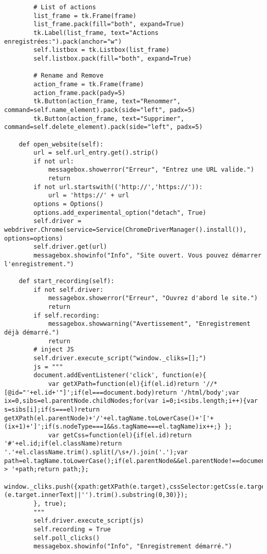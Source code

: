 \documentclass[10pt,a4paper,twocolumn]{article}
\begin{document}
\begin{lstlisting}
        # List of actions
        list_frame = tk.Frame(frame)
        list_frame.pack(fill="both", expand=True)
        tk.Label(list_frame, text="Actions enregistrées:").pack(anchor="w")
        self.listbox = tk.Listbox(list_frame)
        self.listbox.pack(fill="both", expand=True)

        # Rename and Remove
        action_frame = tk.Frame(frame)
        action_frame.pack(pady=5)
        tk.Button(action_frame, text="Renommer", command=self.name_element).pack(side="left", padx=5)
        tk.Button(action_frame, text="Supprimer", command=self.delete_element).pack(side="left", padx=5)

    def open_website(self):
        url = self.url_entry.get().strip()
        if not url:
            messagebox.showerror("Erreur", "Entrez une URL valide.")
            return
        if not url.startswith(('http://','https://')):
            url = 'https://' + url
        options = Options()
        options.add_experimental_option("detach", True)
        self.driver = webdriver.Chrome(service=Service(ChromeDriverManager().install()), options=options)
        self.driver.get(url)
        messagebox.showinfo("Info", "Site ouvert. Vous pouvez démarrer l'enregistrement.")

    def start_recording(self):
        if not self.driver:
            messagebox.showerror("Erreur", "Ouvrez d'abord le site.")
            return
        if self.recording:
            messagebox.showwarning("Avertissement", "Enregistrement déjà démarré.")
            return
        # inject JS
        self.driver.execute_script("window._cliks=[];")
        js = """
        document.addEventListener('click', function(e){
            var getXPath=function(el){if(el.id)return '//*[@id="'+el.id+'"]';if(el===document.body)return '/html/body';var ix=0,sibs=el.parentNode.childNodes;for(var i=0;i<sibs.length;i++){var s=sibs[i];if(s===el)return getXPath(el.parentNode)+'/'+el.tagName.toLowerCase()+'['+(ix+1)+']';if(s.nodeType===1&&s.tagName===el.tagName)ix++;} };
            var getCss=function(el){if(el.id)return '#'+el.id;if(el.className)return '.'+el.className.trim().split(/\s+/).join('.');var path=el.tagName.toLowerCase();if(el.parentNode&&el.parentNode!==document)path=getCss(el.parentNode)+' > '+path;return path;};
            window._cliks.push({xpath:getXPath(e.target),cssSelector:getCss(e.target),tagName:e.target.tagName,innerText:(e.target.innerText||'').trim().substring(0,30)});
        }, true);
        """
        self.driver.execute_script(js)
        self.recording = True
        self.poll_clicks()
        messagebox.showinfo("Info", "Enregistrement démarré.")


\end{lstlisting}
\end{document}
